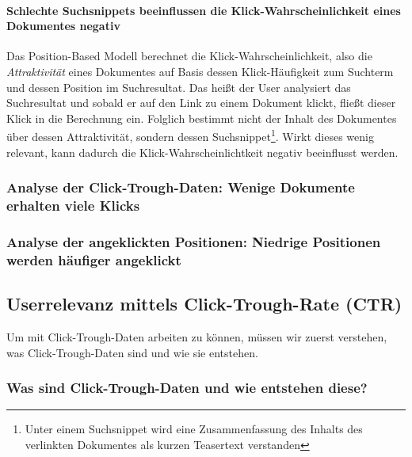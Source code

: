\paragraph{Schlechte Suchsnippets beeinflussen die Klick-Wahrscheinlichkeit eines Dokumentes negativ}
Das Position-Based Modell berechnet die Klick-Wahrscheinlichkeit, also die \textit{Attraktivität} eines Dokumentes auf Basis dessen Klick-Häufigkeit zum Suchterm und dessen Position im Suchresultat. Das heißt der User analysiert das Suchresultat und sobald er auf den Link zu einem Dokument klickt, fließt dieser Klick in die Berechnung ein. Folglich bestimmt nicht der Inhalt des Dokumentes über dessen Attraktivität, sondern dessen Suchsnippet\footnote{Unter einem Suchsnippet wird eine Zusammenfassung des Inhalts des verlinkten Dokumentes als kurzen Teasertext verstanden}. Wirkt dieses wenig relevant, kann dadurch die Klick-Wahrscheinlichtkeit negativ beeinflusst werden.

\subsubsection{Analyse der Click-Trough-Daten: Wenige Dokumente erhalten viele Klicks}
\label{sec:Grundlagen:Grundbegriffe:SemantikUserInteraktionen:DocumentAttraction}



\subsubsection{Analyse der angeklickten Positionen: Niedrige Positionen werden häufiger angeklickt}
\label{sec:Grundlagen:Grundbegriffe:SemantikUserInteraktionen:RankExamination}




\subsection{Userrelevanz mittels Click-Trough-Rate (CTR)}
\label{sec:Grundlagen:Grundbegriffe:Click-Trough-Daten}

Um mit Click-Trough-Daten arbeiten zu können, müssen wir zuerst verstehen, was Click-Trough-Daten sind und wie sie entstehen. 

\subsubsection{Was sind Click-Trough-Daten und wie entstehen diese?}
\label{sec:Grundlagen:Grundbegriffe:Click-Trough-Daten:WasSindClick-Trough-Daten}


